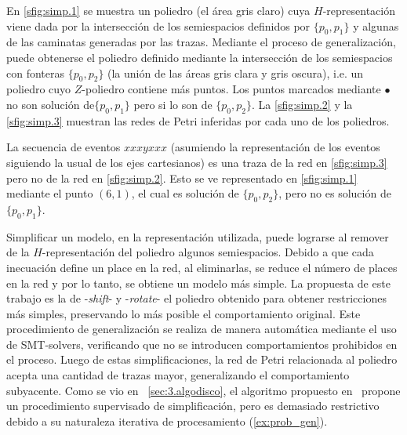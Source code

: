\begin{example} 
    \label{ex:polyhedra}
    En \autoref{sfig:simp.1} se muestra un poliedro (el área gris claro) cuya $H$-representación viene
    dada por la intersección de los semiespacios definidos por $\{p_0,p_1\}$ y algunas de las caminatas generadas por las trazas.
    Mediante el proceso de generalización, puede obtenerse el poliedro definido 
    mediante la intersección de los semiespacios con fonteras $\{p_0,p_2\}$ (la unión de las áreas gris clara y gris oscura), 
    i.e. un poliedro cuyo $Z$-poliedro contiene más puntos.
    Los puntos marcados mediante $\bullet$ no son solución de$\{p_0,p_1\}$ pero si lo son de $\{p_0,p_2\}$.
    La \autoref{sfig:simp.2} y la \autoref{sfig:simp.3} muestran las redes de Petri inferidas por cada uno 
    de los poliedros. 

    La secuencia de eventos $xxxyxxx$ (asumiendo la representación de los eventos siguiendo la usual de los 
    ejes cartesianos) es una traza de la red en \autoref{sfig:simp.3} pero no de la red en \autoref{sfig:simp.2}.
    Esto se ve representado en \autoref{sfig:simp.1} mediante el punto $(6,1)$, el cual es solución de $\{p_0,p_2\}$,
    pero no es solución de $\{p_0,p_1\}$.
\end{example}

Simplificar un modelo, en la representación utilizada, puede lograrse al remover 
de la $H$-representación del poliedro algunos semiespacios. Debido a que cada inecuación
define un place en la red, al eliminarlas, se reduce el número de places en la red y por lo tanto,
se obtiene un modelo más simple. 
La propuesta de este trabajo es la de  -\textit{shift}- y  
-\textit{rotate}- el poliedro obtenido para obtener restricciones más simples, 
preservando lo más posible el comportamiento original. Este procedimiento
de generalización se realiza de manera automática mediante el uso de SMT-solvers, 
verificando que no se introducen comportamientos prohibidos en el proceso.
Luego de estas simplificaciones, la red de Petri relacionada al poliedro acepta
una cantidad de trazas mayor, generalizando el comportamiento subyacente. 
Como se vio en ~\autoref{sec:3.algodisco}, el algoritmo propuesto en~\cite{LeonCB15}
propone un procedimiento supervisado de simplificación, pero es demasiado restrictivo
debido a su naturaleza iterativa de procesamiento (\autoref{ex:prob_gen}).

